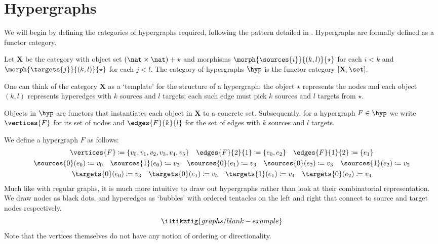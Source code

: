 \section{Hypergraphs}

We will begin by defining the categories of hypergraphs required, following the
pattern detailed in \cite{bonchi2022string}.
Hypergraphs are formally defined as a functor category.

\begin{definition}\label{def:hypergraph}
    Let \(\mathbf{X}\) be the category with object set
    \((\nat \times \nat) + \star\) and morphisms
    \(\morph{\sources{i}}{(k,l)}{\star}\) for each \(i < k\)
    and \(\morph{\targets{j}}{(k,l)}{\star}\) for each \(j < l\).
    The category of hypergraphs \(\hyp\) is the functor category
    \([\mathbf{X}, \set]\).
\end{definition}

One can think of the category \(\mathbf{X}\) as a `template' for the structure
of a hypergraph: the object \(\star\) represents the nodes and each object
\((k, l)\) represents hyperedges with \(k\) sources and \(l\) targets; each such
edge must pick \(k\) sources and \(l\) targets from \(\star\).

Objects in \(\hyp\) are functors that instantiates each object in \(\mathbf{X}\)
to a concrete set.
Subsequently, for a hypergraph \(F \in \hyp\) we write \(\vertices{F}\) for its
set of nodes and \(\edges{F}{k}{l}\) for the set of edges with \(k\) sources and
\(l\) targets.

\begin{example}\label{ex:hypergraph}
    We define a hypergraph \(F\) as follows:
    \begin{gather*}
        \vertices{F} \coloneqq \{v_0,v_1,v_2,v_3,v_4,v_5\}
        \quad
        \edges{F}{2}{1} \coloneqq \{e_0,e_2\}
        \quad
        \edges{F}{1}{2} \coloneqq \{e_1\}
        \\
        \sources{0}(e_0) \coloneqq v_0
        \quad
        \sources{1}(e_0) \coloneqq v_2
        \quad
        \sources{0}(e_1) \coloneqq v_3
        \quad
        \sources{0}(e_2) \coloneqq v_3
        \quad
        \sources{1}(e_2) \coloneqq v_2
        \\
        \targets{0}(e_0) \coloneqq v_3
        \quad
        \targets{0}(e_1) \coloneqq v_5
        \quad
        \targets{1}(e_1) \coloneqq v_4
        \quad
        \targets{0}(e_2) \coloneqq v_4
    \end{gather*}
    Much like with regular graphs, it is much more intuitive to draw out hypergraphs
    rather than look at their combinatorial representation.
    We draw nodes as black dots, and hyperedges as `bubbles' with ordered tentacles
    on the left and right that connect to source and target nodes respectively.
    \[
        \iltikzfig{graphs/blank-example}
    \]
    Note that the vertices themselves do not have any notion of ordering or
    directionality.
\end{example}

